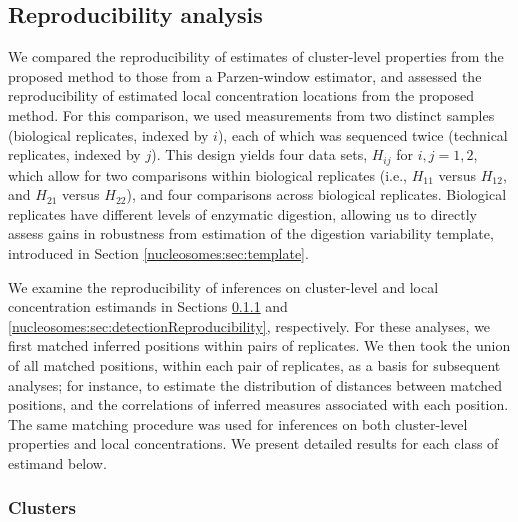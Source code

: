\subsection{Reproducibility analysis}
\label{nucleosomes:sec:reproducibility}

We compared the reproducibility of estimates of cluster-level properties from the proposed method to those from a Parzen-window estimator, and assessed the reproducibility of estimated local concentration locations from the proposed method. 
%
For this comparison, we used measurements from two distinct samples (biological replicates, indexed by $i$), each of which was sequenced twice (technical replicates, indexed by $j$).
This design yields four data sets, $H_{ij}$ for $i,j=1,2$, which allow for two comparisons within biological replicates (i.e., $H_{11}$ versus $H_{12}$, and $H_{21}$ versus $H_{22}$), and  four comparisons across biological replicates.
Biological replicates have different levels of enzymatic digestion, allowing us to directly assess gains in robustness from estimation of the digestion variability template, introduced in Section \ref{nucleosomes:sec:template}.
	
We examine the reproducibility of inferences on cluster-level and local concentration estimands in Sections \ref{nucleosomes:sec:clusterReproducibility} and \ref{nucleosomes:sec:detectionReproducibility}, respectively.
For these analyses, we first matched inferred positions within pairs of replicates.
We then took the union of all matched positions, within each pair of replicates, as a basis for subsequent analyses; for instance, to estimate the distribution of distances between matched positions, and the correlations of inferred measures associated with each position.
%
The same matching procedure was used for inferences on both cluster-level properties and local concentrations.
%
We present detailed results for each class of estimand below.

\subsubsection{Clusters}
\label{nucleosomes:sec:clusterReproducibility}

